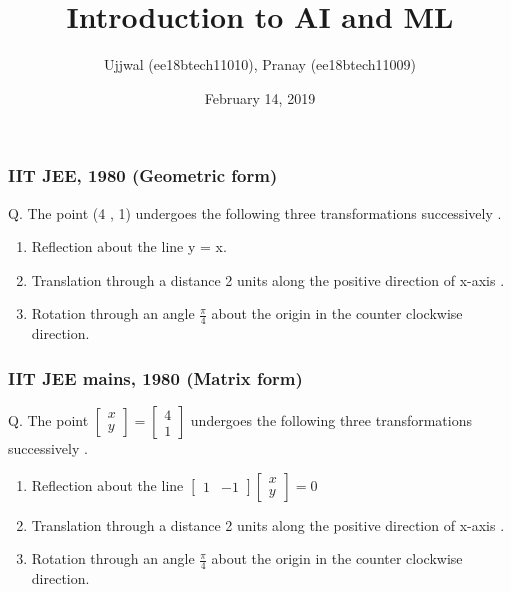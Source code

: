 \documentclass{beamer}
\title[Short title]{Introduction to AI  and ML }
\author{Ujjwal (ee18btech11010), Pranay (ee18btech11009)}
\institute[IITH] 
{
Indian Institute of Technology\\ 
\medskip
\textit{Hyderabad}
}
\date{February 14, 2019}
\begin{document}
\begin{frame}
\titlepage 
\end{frame}

\begin{frame}
\frametitle{IIT JEE, 1980 (Geometric form)} 
Q. The point (4 , 1) undergoes the following three transformations successively .
\begin{enumerate}
\item    Reflection about the line y = x.
\item    Translation through a distance 2 units along the positive direction of x-axis .
\item Rotation through an angle  $ \frac{\pi}{4} $  about the origin in the counter clockwise direction.
\end{enumerate}

\end{frame}


\begin{frame}
\frametitle{IIT JEE  mains, 1980 (Matrix form)} 
Q. The point   $ \begin{bmatrix} x \\y \end{bmatrix}  = \begin{bmatrix} 4 \\1 

\end{bmatrix} $
 undergoes the following three transformations successively .
\begin{enumerate}
\item    Reflection about the line $ \begin{bmatrix} 1 & -1 \end{bmatrix} \begin{bmatrix} x \\y \end{bmatrix}  = 0 $
\item    Translation through a distance 2 units along the positive direction of x-axis .
\item Rotation through an angle $\frac{\pi}{4} $ about the origin in the counter clockwise direction.
\end{enumerate}

\end{frame}
\end{document}
